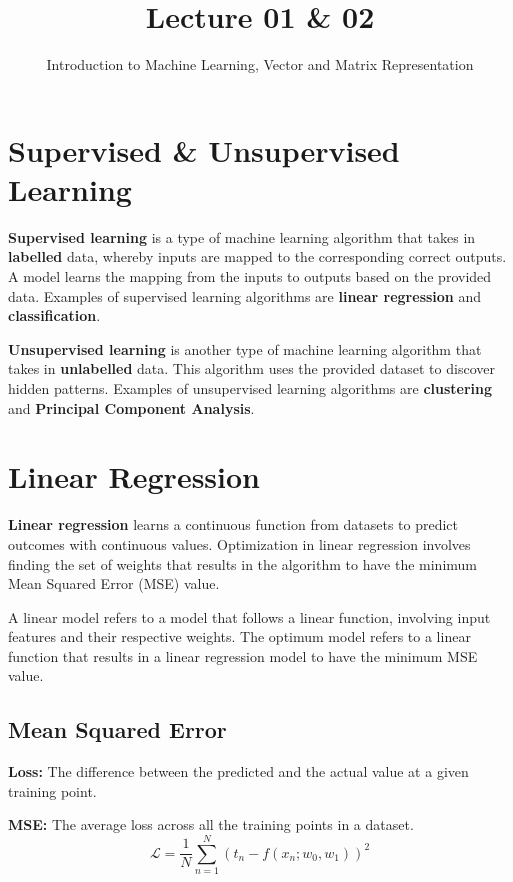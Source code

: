 \documentclass[12pt]{article}
\title{Lecture 01 \& 02}
\author{Introduction to Machine Learning, Vector and Matrix Representation}
\begin{document}
\maketitle{}

\section{Supervised \& Unsupervised Learning}

\textbf{Supervised learning} is a type of machine learning algorithm that takes in \textbf{labelled} data, whereby inputs are mapped to the corresponding correct outputs. A model learns the mapping from the inputs to outputs based on the provided data. Examples of supervised learning algorithms are \textbf{linear regression} and \textbf{classification}.
\vspace{1.5em}

\textbf{Unsupervised learning} is another type of machine learning algorithm that takes in \textbf{unlabelled} data. This algorithm uses the provided dataset to discover hidden patterns. Examples of unsupervised learning algorithms are \textbf{clustering} and \textbf{Principal Component Analysis}.


\section{Linear Regression}

\textbf{Linear regression} learns a continuous function from datasets to predict outcomes with continuous values. Optimization in linear regression involves finding the set of weights that results in the algorithm to have the minimum Mean Squared Error (MSE) value.
\vspace{1.5em}

A linear model refers to a model that follows a linear function, involving input features and their respective weights. The optimum model refers to a linear function that results in a linear regression model to have the minimum MSE value.

\subsection{Mean Squared Error}

\textbf{Loss: } The difference between the predicted and the actual value at a given training point.

\textbf{MSE: } The average loss across all the training points in a dataset.
\[
\mathcal{L} = \frac{1}{N} \sum_{n=1}^{N} \left(t_n - f(x_n; w_0, w_1)\right)^2
\]
\end{document}
